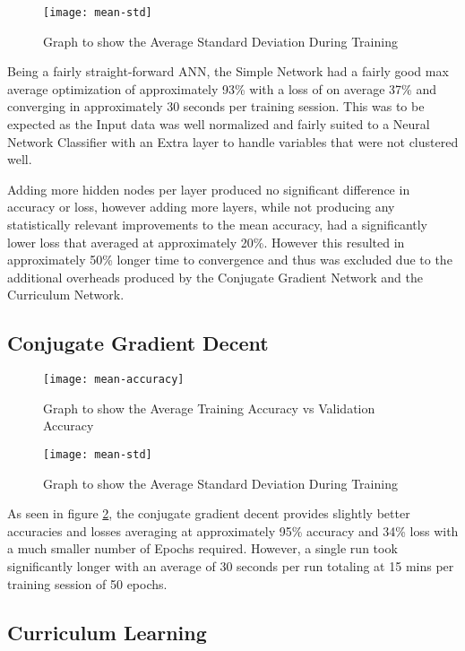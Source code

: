 \documentclass[conference]{IEEEtran}
\begin{document}
\begin{figure}
	\caption{Graph to show the Average Standard Deviation During Training}
	\texttt{[image: mean-std]}
	\centering
	\label{fig:mean-std}
\end{figure}

Being a fairly straight-forward ANN, the Simple Network had a fairly good max average optimization of approximately 93\% with a loss of on average 37\% and converging in approximately 30 seconds per training session.
This was to be expected as the Input data was well normalized and fairly suited to a Neural Network Classifier with an Extra layer to handle variables that were not clustered well.

Adding more hidden nodes per layer produced no significant difference in accuracy or loss, however adding more layers, while not producing any statistically relevant improvements to the mean accuracy, had a significantly lower loss that averaged at approximately 20\%. However this resulted in approximately 50\% longer time to convergence and thus was excluded due to the additional overheads produced by the Conjugate Gradient Network and the Curriculum Network.

\subsection{Conjugate Gradient Decent}

\begin{figure}
	\caption{Graph to show the Average Training Accuracy vs Validation Accuracy}
	\texttt{[image: mean-accuracy]}
	\centering
	\label{fig:mean-acc-c}
\end{figure}

\begin{figure}
	\caption{Graph to show the Average Standard Deviation During Training}
	\texttt{[image: mean-std]}
	\centering
	\label{fig:mean-std-c}
\end{figure}

As seen in figure \ref{fig:mean-acc-c}, the conjugate gradient decent provides slightly better accuracies and losses averaging at approximately 95\% accuracy and 34\% loss with a much smaller number of Epochs required. However, a single run took significantly longer with an average of 30 seconds per run totaling at 15 mins per training session of 50 epochs.

\subsection{Curriculum Learning}
\end{document}
